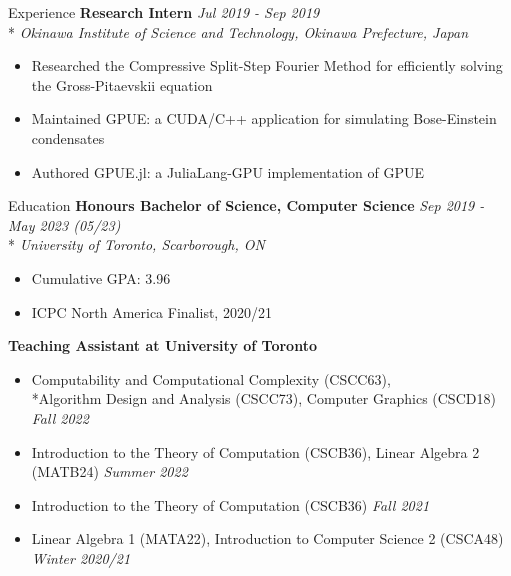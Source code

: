 \documentclass[11pt, letterpaper]{article}
\begin{document}
\begin{section}{Experience}
\textbf{Research Intern}
\hfill
\textit{Jul 2019 - Sep 2019}\\*
\textit{Okinawa Institute of Science and Technology, Okinawa Prefecture, Japan}
\begin{itemize}
  \item Researched the Compressive Split-Step Fourier Method for efficiently solving the Gross-Pitaevskii equation
  \item Maintained GPUE: a CUDA/C++ application for simulating Bose-Einstein condensates
  \item Authored GPUE.jl: a JuliaLang-GPU implementation of GPUE
\end{itemize}

\end{section}

\begin{section}{Education}
\textbf{Honours Bachelor of Science, Computer Science}
\hfill
\textit{Sep 2019 - May 2023 (05/23)}\\*
\textit{University of Toronto, Scarborough, ON}
\begin{itemize}
  \item Cumulative GPA: 3.96
  \item ICPC North America Finalist, 2020/21 \\
\end{itemize}

\textbf{Teaching Assistant at University of Toronto}
\begin{itemize}
  \item Computability and Computational Complexity (CSCC63), \\*Algorithm Design and Analysis (CSCC73), Computer Graphics (CSCD18) \hfill \textit{Fall 2022}
  \item Introduction to the Theory of Computation (CSCB36), Linear Algebra 2 (MATB24) \hfill \textit{Summer 2022}
  \item Introduction to the Theory of Computation (CSCB36) \hfill \textit{Fall 2021}
  \item Linear Algebra 1 (MATA22), Introduction to Computer Science 2 (CSCA48) \hfill \textit{Winter 2020/21}
\end{itemize}

\end{section}
\end{document}
